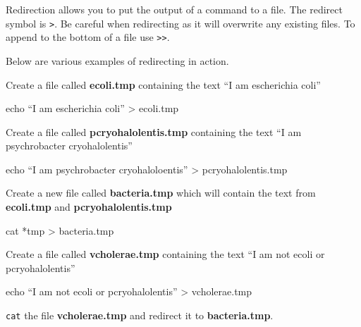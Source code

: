 \documentclass[
  letterpaper,
  DIV=11,
  numbers=noendperiod]{scrreprt}
\newenvironment{Shaded}{\begin{snugshade}}{\end{snugshade}}
\newcommand{\BuiltInTok}[1]{\textcolor[rgb]{0.00,0.23,0.31}{#1}}
\newcommand{\FunctionTok}[1]{\textcolor[rgb]{0.28,0.35,0.67}{#1}}
\newcommand{\NormalTok}[1]{\textcolor[rgb]{0.00,0.23,0.31}{#1}}
\newcommand{\OperatorTok}[1]{\textcolor[rgb]{0.37,0.37,0.37}{#1}}
\newcommand{\PreprocessorTok}[1]{\textcolor[rgb]{0.68,0.00,0.00}{#1}}
\begin{document}
Redirection allows you to put the output of a command to a file. The
redirect symbol is \texttt{\textgreater{}}. Be careful when redirecting
as it will overwrite any existing files. To append to the bottom of a
file use \texttt{\textgreater{}\textgreater{}}.

Below are various examples of redirecting in action.

Create a file called \textbf{ecoli.tmp} containing the text ``I am
escherichia coli''

\begin{Shaded}
\begin{Highlighting}[]
\BuiltInTok{echo}\NormalTok{ “I am escherichia coli” }\OperatorTok{\textgreater{}}\NormalTok{ ecoli.tmp}
\end{Highlighting}
\end{Shaded}

Create a file called \textbf{pcryohalolentis.tmp} containing the text
``I am psychrobacter cryohalolentis''

\begin{Shaded}
\begin{Highlighting}[]
\BuiltInTok{echo}\NormalTok{ “I am psychrobacter cryohaloloentis” }\OperatorTok{\textgreater{}}\NormalTok{ pcryohalolentis.tmp}
\end{Highlighting}
\end{Shaded}

Create a new file called \textbf{bacteria.tmp} which will contain the
text from \textbf{ecoli.tmp} and \textbf{pcryohalolentis.tmp}

\begin{Shaded}
\begin{Highlighting}[]
\FunctionTok{cat} \PreprocessorTok{*}\NormalTok{tmp }\OperatorTok{\textgreater{}}\NormalTok{ bacteria.tmp}
\end{Highlighting}
\end{Shaded}

Create a file called \textbf{vcholerae.tmp} containing the text ``I am
not ecoli or pcryohalolentis''

\begin{Shaded}
\begin{Highlighting}[]
\BuiltInTok{echo}\NormalTok{ “I am not ecoli or pcryohalolentis” }\OperatorTok{\textgreater{}}\NormalTok{ vcholerae.tmp}
\end{Highlighting}
\end{Shaded}

\texttt{cat} the file \textbf{vcholerae.tmp} and redirect it to
\textbf{bacteria.tmp}.
\end{document}
